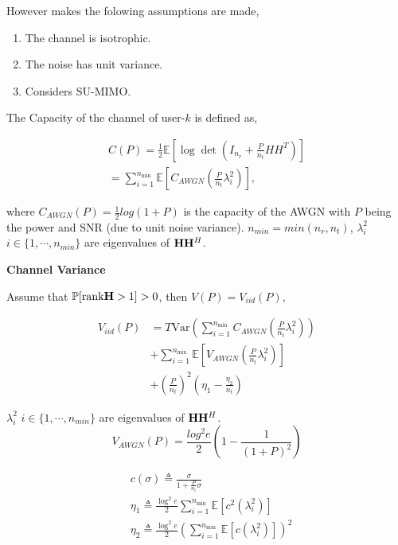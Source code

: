 \documentclass[a4paper, 12pt, onecolumn, journal, twoside, draftclsnofoot]{IEEEtran}
\begin{document}
However \cite{collins2019} makes the folowing assumptions are made,
 
\begin{enumerate}
\item The channel is isotrophic.
\item The noise has unit variance.
\item Considers SU-MIMO.
\end{enumerate}


The Capacity of the channel of user-$k$ is defined as, 

\begin{equation*}
\begin{gathered}C(P)=\frac{1}{2}\mathbb{E}\left[\log\det\left(I_{n_{r}}+\frac{P}{n_{t}}HH^{T}\right)\right]\\=\sum_{i=1}^{n_{\mathrm{min}}}\mathbb{E}\left[C_{AWGN}\left(\frac{P}{n_{t}}\lambda_{i}^{2}\right)\right],\end{gathered}
\end{equation*}

where $C_{AWGN}(P) = \frac{1}{2}log(1+P)$ is the capacity of the AWGN with $P$ being the power and SNR (due to unit noise variance). $n_{min} = min(n_r, n_t)$, $\lambda_i^2$ $ i\in \{1, \cdots, n_{min}\}$ are eigenvalues of ${\bf H} {\bf H}^H$.

\newpage
\textbf{Channel Variance} 

Assume that $\mathbb{P}[\text{rank} {\bf H} > 1] > 0$, then $V (P) = V_{iid}(P)$, 

\begin{equation*}\begin{aligned}V_{iid}(P)&=T\mathrm{Var}\left(\sum_{i=1}^{n_{\min}}C_{AWGN}\left(\frac{P}{n_{t}}\lambda_{i}^{2}\right)\right)\\&+\sum_{i=1}^{n_{\min}}\mathbb{E}\left[V_{AWGN}\left(\frac{P}{n_{t}}\lambda_{i}^{2}\right)\right]\\&+\left(\frac{P}{n_t}\right)^2\left(\eta_1-\frac{\eta_2}{n_t}\right)\end{aligned}\end{equation*}


$\lambda_i^2$ $ i\in \{1, \cdots, n_{min}\}$ are eigenvalues of ${\bf H} {\bf H}^H$.
\begin{equation*}
V_{AWGN}(P) = \frac{log^2e}{2}(1 - \frac{1}{(1+P)^2})
\end{equation*}

\begin{equation*}
\begin{aligned}&c(\sigma)\triangleq\frac{\sigma}{1+\frac{P}{n_{t}}\sigma}\\&\eta_{1}\triangleq\frac{\log^{2}e}{2}\sum_{i=1}^{n_{\min}}\mathbb{E}\left[c^{2}(\lambda_{i}^{2})\right]\\&\eta_{2}\triangleq\frac{\log^{2}e}{2}\left(\sum_{i=1}^{n_{\min}}\mathbb{E}\left[c(\lambda_{i}^{2})\right]\right)^{2}\end{aligned}
\end{equation*}
\end{document}

